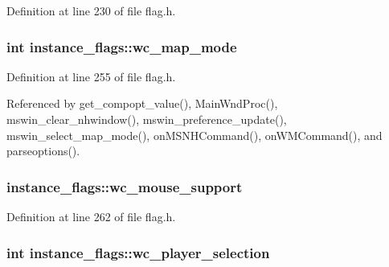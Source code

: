 Definition at line 230 of file flag.\+h.

\hypertarget{structinstance__flags_a10495720747b71f0c42953aa2b96d5b5}{
\subsubsection[{wc\+\_\+map\+\_\+mode}]{\setlength{\rightskip}{0pt plus 5cm}int instance\+\_\+flags\+::wc\+\_\+map\+\_\+mode}}\label{structinstance__flags_a10495720747b71f0c42953aa2b96d5b5}


Definition at line 255 of file flag.\+h.



Referenced by get\+\_\+compopt\+\_\+value(), Main\+Wnd\+Proc(), mswin\+\_\+clear\+\_\+nhwindow(), mswin\+\_\+preference\+\_\+update(), mswin\+\_\+select\+\_\+map\+\_\+mode(), on\+M\+S\+N\+H\+Command(), on\+W\+M\+Command(), and parseoptions().

\hypertarget{structinstance__flags_ac319f8f3ce967aecfa87845d203f8691}{
\subsubsection[{wc\+\_\+mouse\+\_\+support}]{ instance\+\_\+flags\+::wc\+\_\+mouse\+\_\+support}}\label{structinstance__flags_ac319f8f3ce967aecfa87845d203f8691}


Definition at line 262 of file flag.\+h.

\hypertarget{structinstance__flags_a8c8a16eb50807ff19905909a1549e1a3}{
\subsubsection[{wc\+\_\+player\+\_\+selection}]{\setlength{\rightskip}{0pt plus 5cm}int instance\+\_\+flags\+::wc\+\_\+player\+\_\+selection}}\label{structinstance__flags_a8c8a16eb50807ff19905909a1549e1a3}


